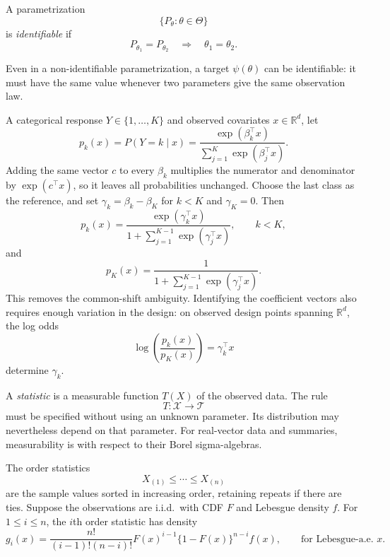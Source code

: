 \begin{definition}[Identifiability]
A parametrization
\[
\{P_\theta:\theta\in\Theta\}
\]
is \emph{identifiable} if
\[
P_{\theta_1}=P_{\theta_2}
\quad\Longrightarrow\quad
\theta_1=\theta_2.
\]

Even in a non-identifiable parametrization, a target $\psi(\theta)$ can
be identifiable: it must have the same value whenever two parameters
give the same observation law.
\end{definition}

\begin{example}
A categorical response $Y\in \{1,\ldots,K\}$ and observed covariates
$x\in\mathbb{R}^d$, let
\[
p_k(x)
=
P(Y=k\mid x)
=
\frac{\exp(\beta_k^\top x)}
{\sum_{j=1}^K\exp(\beta_j^\top x)}.
\]
Adding the same vector $c$ to every $\beta_k$ multiplies the numerator and
denominator by $\exp(c^\top x)$, so it leaves all probabilities unchanged.
Choose the last class as the reference, and set
$\gamma_k=\beta_k-\beta_K$ for $k<K$ and $\gamma_K=0$. Then
\[
p_k(x)
=
\frac{\exp(\gamma_k^\top x)}
{1+\sum_{j=1}^{K-1}\exp(\gamma_j^\top x)},
\qquad k<K,
\]
and
\[
p_K(x)
=
\frac{1}
{1+\sum_{j=1}^{K-1}\exp(\gamma_j^\top x)}.
\]
This removes the common-shift ambiguity. Identifying the coefficient vectors
also requires enough variation in the design: on observed design points
spanning $\mathbb{R}^d$, the log odds
\[
\log\left(\frac{p_k(x)}{p_K(x)}\right)=\gamma_k^\top x
\]
determine $\gamma_k$.
\end{example}

\begin{definition}[Statistic]
A \emph{statistic} is a measurable function $T(X)$ of the observed data.
The rule
\[
T:\mathcal{X}\longrightarrow\mathcal{T}
\]
must be specified without using an unknown parameter. Its distribution
may nevertheless depend on that parameter. For real-vector data and
summaries, measurability is with respect to their Borel
sigma-algebras.
\end{definition}

\begin{definition}
    The order statistics
\[
X_{(1)}\leq\cdots\leq X_{(n)}
\]
are the sample values sorted in increasing order, retaining repeats if
there are ties. Suppose the observations are i.i.d.\ with CDF $F$ and
Lebesgue density $f$. For $1\leq i\leq n$, the $i$th order statistic has
density
\begin{equation}
g_i(x)
=
\frac{n!}{(i-1)!(n-i)!}
F(x)^{i-1}\bigl\{1-F(x)\bigr\}^{n-i}f(x),
\qquad\text{for Lebesgue-a.e.\ }x.
\end{equation}
\end{definition}


